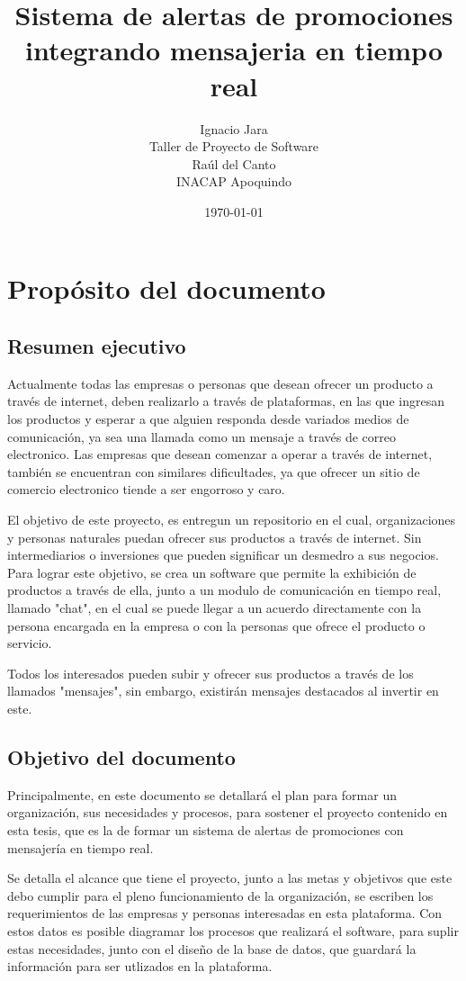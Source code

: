 \documentclass[letterpaper,openright,10pt,oneside]{report}
\title{\textbf{Sistema de alertas de promociones integrando mensajeria en tiempo real}}
\author{Ignacio Jara\\Taller de Proyecto de Software\\Raúl del Canto\\INACAP Apoquindo}
\date{\today}
\begin{document}
\maketitle

\part{Propósito del documento}
	\chapter*{Resumen ejecutivo}
	Actualmente todas las empresas o personas que desean ofrecer un producto a través de internet, deben realizarlo a través de plataformas, en las que ingresan los productos y esperar a que alguien responda desde variados medios de comunicación, ya sea una llamada como un mensaje a través de correo electronico. Las empresas que desean comenzar a operar a través de internet, también se encuentran con similares dificultades, ya que ofrecer un sitio de comercio electronico tiende a ser engorroso y caro.
	

	El objetivo de este proyecto, es entregun un repositorio en el cual, organizaciones y personas naturales puedan ofrecer sus productos a través de internet. Sin intermediarios o inversiones que pueden significar un desmedro a sus negocios.
	Para lograr este objetivo, se crea un software que permite la exhibición de productos a través de ella, junto a un modulo de comunicación en tiempo real, llamado "chat", en el cual se puede llegar a un acuerdo directamente con la persona encargada en la empresa o con la personas que ofrece el producto o servicio.
	
	Todos los interesados pueden subir y ofrecer sus productos a través de los llamados "mensajes", sin embargo, existirán mensajes destacados al invertir en este.
	
	\chapter*{Objetivo del documento}
	Principalmente, en este documento se detallará el plan para formar un organización, sus necesidades y procesos, para sostener el proyecto contenido en esta tesis, que es la de formar un sistema de alertas de promociones con mensajería en tiempo real.
	
	Se detalla el alcance que tiene el proyecto, junto a las metas y objetivos que este debo cumplir para el pleno funcionamiento de la organización, se escriben los requerimientos de las empresas y personas interesadas en esta plataforma. Con estos datos es posible diagramar los procesos que realizará el software, para suplir estas necesidades, junto con el diseño de la base de datos, que guardará la información para ser utlizados en la plataforma.
	
\end{document}
